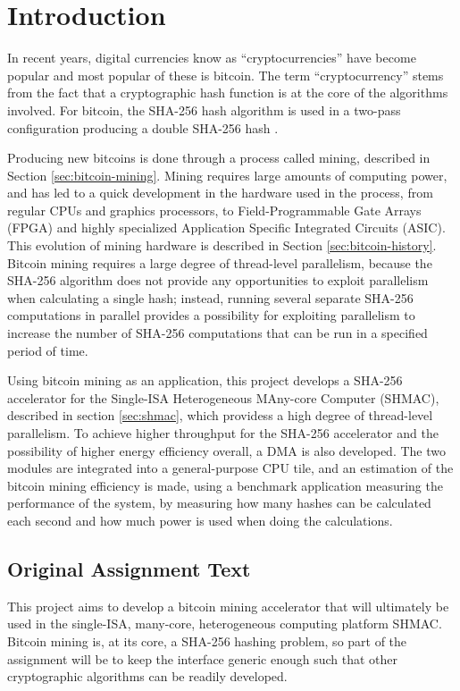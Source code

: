 \chapter{Introduction}

In recent years, digital currencies know as ``cryptocurrencies'' have become popular
and most popular of these is bitcoin. The term ``cryptocurrency'' stems from the fact
that a cryptographic hash function is at the core of the algorithms involved. For bitcoin,
the SHA-256 hash algorithm is used in a two-pass configuration producing a double SHA-256
hash \cite{bitcoin}.

Producing new bitcoins is done through a process called mining, described in Section \ref{sec:bitcoin-mining}.
Mining requires large amounts of computing power, and has led to a quick development in
the hardware used in the process, from regular CPUs and graphics processors, to Field-Programmable Gate Arrays (FPGA) and highly specialized Application Specific
Integrated Circuits (ASIC). This evolution of mining hardware is described in Section \ref{sec:bitcoin-history}.
Bitcoin mining requires a large degree of thread-level parallelism, because the SHA-256
algorithm does not provide any opportunities to exploit parallelism when calculating a single hash;
instead, running several separate SHA-256 computations in parallel provides a possibility for
exploiting parallelism to increase the number of SHA-256 computations that can be run in a specified period of time.

Using bitcoin mining as an application, this project develops a SHA-256 accelerator
for the Single-ISA Heterogeneous MAny-core Computer (SHMAC), described in section \ref{sec:shmac},
which providess a high degree of thread-level parallelism. To achieve higher throughput for the
SHA-256 accelerator and the possibility of higher energy efficiency overall, a DMA is also
developed. The two modules are integrated into a general-purpose CPU tile, and an estimation
of the bitcoin mining efficiency is made, using a benchmark application measuring the performance
of the system, by measuring how many hashes can be calculated each second and how much power
is used when doing the calculations.

\section{Original Assignment Text}

This project aims to develop a bitcoin mining accelerator that will ultimately be
used in the single-ISA, many-core, heterogeneous computing platform SHMAC. Bitcoin
mining is, at its core, a SHA-256 hashing problem, so part of the assignment will
be to keep the interface generic enough such that other cryptographic algorithms
can be readily developed.

